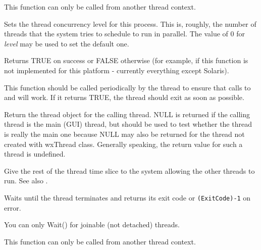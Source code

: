 This function can only be called from another thread context.

\label{wxthreadsetconcurrency}


Sets the thread concurrency level for this process. This is, roughly, the
number of threads that the system tries to schedule to run in parallel.
The value of $0$ for {\it level} may be used to set the default one.

Returns TRUE on success or FALSE otherwise (for example, if this function is
not implemented for this platform - currently everything except Solaris).

\label{wxthreadtestdestroy}


This function should be called periodically by the thread to ensure that calls
to  and  will
work. If it returns TRUE, the thread should exit as soon as possible.

\label{wxthreadthis}


Return the thread object for the calling thread. NULL is returned if the calling thread
is the main (GUI) thread, but  should be used to test
whether the thread is really the main one because NULL may also be returned for the thread
not created with wxThread class. Generally speaking, the return value for such a thread
is undefined.

\label{wxthreadyield}


Give the rest of the thread time slice to the system allowing the other threads to run.
See also .

\label{wxthreadwait}


Waits until the thread terminates and returns its exit code or {\tt (ExitCode)-1} on error.

You can only Wait() for joinable (not detached) threads.

This function can only be called from another thread context.

